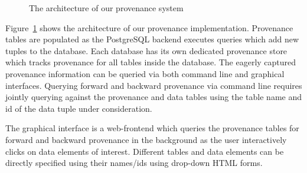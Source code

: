 \begin{figure}
\label{fig:provarch}
\caption{The architecture of our provenance system}
\end{figure}

Figure~\ref{fig:provarch} shows the architecture of our provenance implementation. Provenance tables are populated as the PostgreSQL backend executes queries which add new tuples to the database. Each database has its own dedicated provenance store which tracks provenance for all tables inside the database. The eagerly captured provenance information can be queried via both command line and graphical interfaces. Querying forward and backward provenance via command line requires jointly querying against the provenance and data tables using the table name and id of the data tuple under consideration. 

The graphical interface is a web-frontend which queries the provenance tables for forward and backward provenance in the background as the user interactively clicks on data elements of interest. Different tables and data elements can be directly specified using their names/ids using drop-down HTML forms.